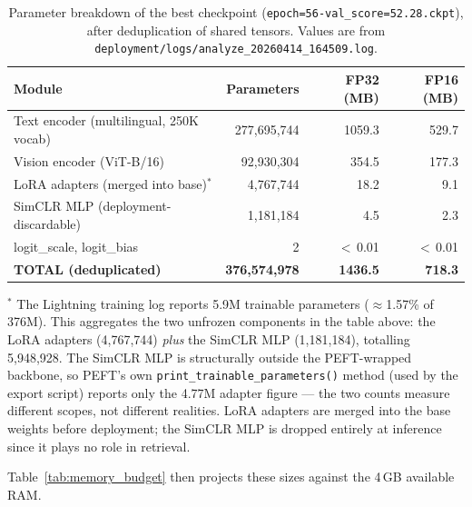 \documentclass[../main.tex]{subfiles}
\begin{document}
\begin{table}[htbp]
\centering
\caption{Parameter breakdown of the best checkpoint (\texttt{epoch=56-val\_score=52.28.ckpt}), after deduplication of shared tensors. Values are from \texttt{deployment/logs/analyze\_20260414\_164509.log}.}
\label{tab:model_breakdown}
\renewcommand{\arraystretch}{1.3}
\begin{tabularx}{\textwidth}{Xrrr}
\toprule
\textbf{Module} & \textbf{Parameters} & \textbf{FP32 (MB)} & \textbf{FP16 (MB)} \\
\midrule
Text encoder (multilingual, 250K vocab)  & 277,695,744 & 1059.3 & 529.7 \\
Vision encoder (ViT-B/16)                & 92,930,304  & 354.5  & 177.3 \\
LoRA adapters (merged into base)$^{*}$   & 4,767,744   & 18.2   & 9.1 \\
SimCLR MLP (deployment-discardable)      & 1,181,184   & 4.5    & 2.3 \\
logit\_scale, logit\_bias                & 2           & $<$\,0.01 & $<$\,0.01 \\
\midrule
\textbf{TOTAL (deduplicated)}            & \textbf{376,574,978} & \textbf{1436.5} & \textbf{718.3} \\
\bottomrule
\end{tabularx}
\end{table}

\noindent \footnotesize{$^{*}$ The Lightning training log reports 5.9M trainable parameters ($\approx$1.57\% of 376M). This aggregates the two unfrozen components in the table above: the LoRA adapters (4,767,744) \textit{plus} the SimCLR MLP (1,181,184), totalling 5,948,928. The SimCLR MLP is structurally outside the PEFT-wrapped backbone, so PEFT's own \texttt{print\_trainable\_parameters()} method (used by the export script) reports only the 4.77M adapter figure --- the two counts measure different scopes, not different realities. LoRA adapters are merged into the base weights before deployment; the SimCLR MLP is dropped entirely at inference since it plays no role in retrieval.}
\normalsize


\vspace{0.5em}

\noindent Table~\ref{tab:memory_budget} then projects these sizes against the 4\,GB available RAM.
\end{document}
